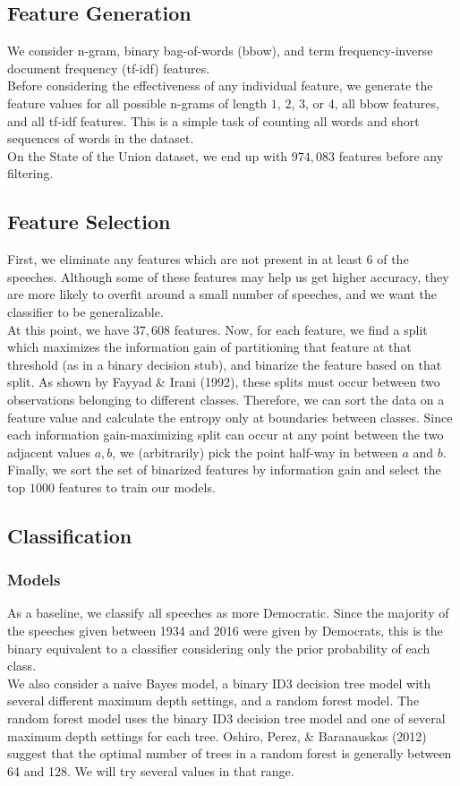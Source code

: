 \documentclass{amsart}
\theoremstyle{definition}
\theoremstyle{remark}
\numberwithin{equation}{section}
\begin{document}
\subsection{Feature Generation}
We consider n-gram, binary bag-of-words (bbow), and term frequency-inverse document frequency (tf-idf) features.\\
Before considering the effectiveness of any individual feature, we generate the feature values for all possible n-grams of length $1$, $2$, $3$, or $4$, all bbow features, and all tf-idf features. This is a simple task of counting all words and short sequences of words in the dataset.\\
On the State of the Union dataset, we end up with $974,083$ features before any filtering.\\

\subsection{Feature Selection}
First, we eliminate any features which are not present in at least 6 of the speeches. Although some of these features may help us get higher accuracy, they are more likely to overfit around a small number of speeches, and we want the classifier to be generalizable.\\
At this point, we have $37,608$ features. Now, for each feature, we find a split which maximizes the information gain of partitioning that feature at that threshold (as in a binary decision stub), and binarize the feature based on that split. As shown by Fayyad \& Irani (1992), these splits must occur between two observations belonging to different classes. Therefore, we can sort the data on a feature value and calculate the entropy only at boundaries between classes. Since each information gain-maximizing split can occur at any point between the two adjacent values $a, b$, we (arbitrarily) pick the point half-way in between $a$ and $b$.\\
Finally, we sort the set of binarized features by information gain and select the top $1000$ features to train our models.\\

\subsection{Classification}
\subsubsection{Models}
As a baseline, we classify all speeches as more Democratic. Since the majority of the speeches given between 1934 and 2016 were given by Democrats, this is the binary equivalent to a classifier considering only the prior probability of each class.\\
We also consider a naive Bayes model, a binary ID3 decision tree model with several different maximum depth settings, and a random forest model. The random forest model uses the binary ID3 decision tree model and one of several maximum depth settings for each tree. Oshiro, Perez, \& Baranauskas (2012) suggest that the optimal number of trees in a random forest is generally between 64 and 128. We will try several values in that range.\\
\end{document}
